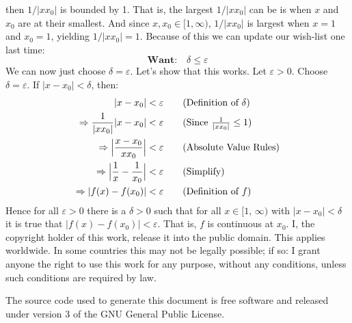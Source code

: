 \documentclass{article}
\theoremstyle{normal}
\begin{document}
    then $1/|xx_{0}|$ is bounded by 1. That is, the largest $1/|xx_{0}|$ can
    be is when $x$ and $x_{0}$ are at their smallest. And since
    $x,x_{0}\in[1,\infty)$, $1/|xx_{0}|$ is largest when $x=1$ and $x_{0}=1$,
    yielding $1/|xx_{0}|=1$. Because of this we can update our wish-list one
    last time:
    \begin{equation}
        \textbf{Want:}\quad
        \delta\leq\varepsilon
    \end{equation}
    We can now just choose $\delta=\varepsilon$. Let's show that this works.
    Let $\varepsilon>0$. Choose $\delta=\varepsilon$. If $|x-x_{0}|<\delta$,
    then:
    \begin{align}
        |x-x_{0}|&<\varepsilon
            \tag{Definition of $\delta$}\\
        \Rightarrow
            \frac{1}{|xx_{0}|}|x-x_{0}|&<\varepsilon
                \tag{Since $\frac{1}{|xx_{0}|}\leq{1}$}\\
        \Rightarrow
            \Big|\frac{x-x_{0}}{xx_{0}}\Big|&<\varepsilon
                \tag{Absolute Value Rules}\\
        \Rightarrow
            \Big|\frac{1}{x}-\frac{1}{x_{0}}\Big|&<\varepsilon
                \tag{Simplify}\\
        \Rightarrow
            |f(x)-f(x_{0})|&<\varepsilon
                \tag{Definition of $f$}
    \end{align}
    Hence for all $\varepsilon>0$ there is a $\delta>0$ such that for all
    $x\in[1,\,\infty)$ with $|x-x_{0}|<\delta$ it is true that
    $|f(x)-f(x_{0})|<\varepsilon$. That is, $f$ is continuous at $x_{0}$.
    \newpage
    I, the copyright holder of this work, release it into the public domain.
    This applies worldwide. In some countries this may not be legally possible;
    if so: I grant anyone the right to use this work for any purpose, without
    any conditions, unless such conditions are required by law.
    \par\hfill\par
    The source code used to generate this document is free software and released
    under version 3 of the GNU General Public License.
\end{document}
